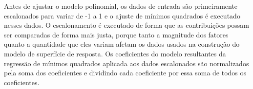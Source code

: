Antes de ajustar o modelo polinomial, os dados de entrada são primeiramente escalonados para variar de -1 a 1 e o ajuste de mínimos quadrados é executado nesses dados. O escalonamento é executado de forma que as contribuições possam ser comparadas de forma mais justa, porque tanto a magnitude dos fatores quanto a quantidade que eles variam afetam os dados usados na construção do modelo de superfície de resposta. Os coeficientes do modelo resultantes da regressão de mínimos quadrados aplicada aos dados escalonados são normalizados pela soma
dos coeficientes e dividindo cada coeficiente por essa soma de todos os coeficientes.